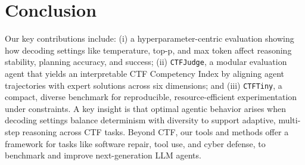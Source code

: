 \section{Conclusion}
Our key contributions include: (i) a hyperparameter-centric evaluation showing how decoding settings like temperature, top-p, and max token affect reasoning stability, planning accuracy, and success; (ii) \texttt{CTFJudge}, a modular evaluation agent that yields an interpretable CTF Competency Index by aligning agent trajectories with expert solutions across six dimensions; and (iii) \texttt{CTFTiny}, a compact, diverse benchmark for reproducible, resource-efficient experimentation under constraints. A key insight is that optimal agentic behavior arises when decoding settings balance determinism with  diversity to support adaptive, multi-step reasoning across CTF tasks. Beyond CTF, our tools and methods offer a framework for tasks like software repair, tool use, and cyber defense, to benchmark and improve next-generation LLM agents.